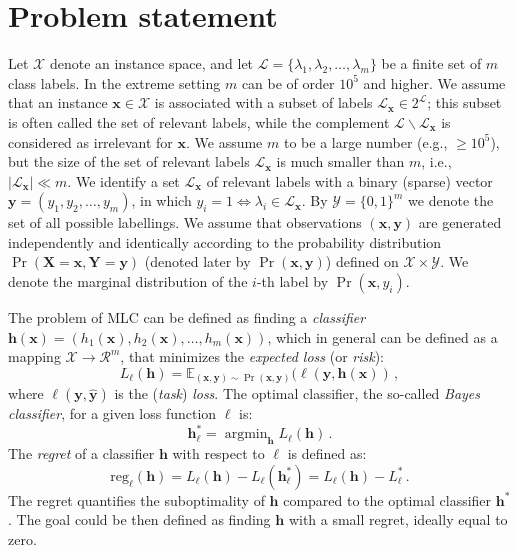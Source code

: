 \documentclass{article}
\renewcommand{\vec}[1]{\boldsymbol{#1}}
\newcommand{\bx}{\vec{x}}
\newcommand{\by}{\vec{y}}
\newcommand{\bh}{\vec{h}}
\newcommand{\bX}{\vec{X}}
\newcommand{\bY}{\vec{Y}}
\newcommand{\calX}{\mathcal{X}}
\newcommand{\calY}{\mathcal{Y}}
\newcommand{\calL}{\mathcal{L}}
\newcommand{\calR}{\mathcal{R}}
\newcommand{\reg}{\mathrm{reg}}
\newcommand{\loss}{L}
\DeclareMathOperator*{\argmin}{\arg \min}
\newcommand{\sectionBefore}{-0pt}
\newcommand{\sectionAfter}{-0pt}
\begin{document}
\vspace{\sectionBefore}
\section{Problem statement}
\label{sec:formal}
\vspace{\sectionAfter}

Let $\calX$ denote an instance space, and let $\calL = \{\lambda_1,\lambda_2, \ldots,\lambda_m\}$ be a finite set of $m$ class labels. 
In the extreme setting $m$ can be of order $10^5$ and higher.
We assume that an instance $\bx \in \calX$ is associated with a subset of
labels $\calL_{\bx} \in 2^\calL$; this subset is often called the set of relevant labels, while the complement
$\calL \backslash \calL_{\bx}$ is considered as irrelevant for $\bx$. We assume $m$ to be a large number (e.g., $\ge 10^5$), but the size of the set of relevant labels $\calL_{\bx}$ is much smaller than $m$, i.e., $|\calL_{\bx}| \ll m$. We identify a set $\calL_{\bx}$ of relevant labels with a binary (sparse)
vector $\by = (y_1,y_2, \ldots, y_m)$, in which $y_i = 1 \Leftrightarrow \lambda_i \in \calL_{\bx}$. By $\calY = \{0, 1\}^m$ we denote the set of all
possible labellings.
We assume that observations $(\bx, \by)$ are generated independently and identically according to the
probability distribution $\Pr(\bX = \bx,\bY = \by)$ (denoted later by $\Pr(\bx, \by)$) defined on $\calX \times \calY$. We denote the marginal distribution of the $i$-th label by $\Pr(\bx,y_i)$. %

The problem of MLC can be defined as finding a  \emph{classifier} $\bh(\bx) = (h_1(\bx), h_2(\bx),\ldots, h_m(\bx))$, 
which in general can be defined as a mapping $\calX \rightarrow \calR^m$, that minimizes the \emph{expected loss} (or \emph{risk}):  
$$
\loss_\ell(\bh) = \mathbb{E}_{(\bx,\by) \sim \Pr(\bx,\by)} (\ell(\by, \bh(\bx))\,,
$$
where $\ell(\by, \hat{\by})$ is the  (\emph{task}) \emph{loss}.
%
The optimal classifier,  the so-called \emph{Bayes classifier},  for a given loss function $\ell$ is:
$$
\bh^*_\ell = \argmin_{\bh}  \loss_\ell(\bh) \,.
$$
The \emph{regret} of a classifier $\bh$ with respect to $\ell$ is defined as:
 $$
\reg_\ell(\bh) = \loss_\ell(\bh) - \loss_\ell(\bh_{\ell}^*) = \loss_\ell(\bh) - \loss_\ell^* \,.
$$
The regret quantifies the suboptimality of $\bh$ compared to the optimal classifier $\bh^*$. The goal could be then defined as finding $\bh$ with a small regret, ideally equal to zero.
\end{document}
